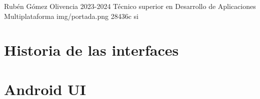 \documentclass{\ClassPath/yukibook}
\begin{document}
    {Rubén Gómez Olivencia}  %
    {2023-2024}    %
    {Técnico superior en \linebreak Desarrollo de  Aplicaciones Multiplataforma} %
    {}%
    {}%
    {img/portada.png} %
    {28436c}
    {si} %


    \coverpage
    \graphicspath{{../../../yukibook.cls/}}
    \licensepage

    \tableofcontents


    \part{Historia de las interfaces}
    \graphicspath{{./img/di/tema_1}}
    


    \part{Android UI}
    \graphicspath{{./img/di/tema_2}}
    
\end{document}
